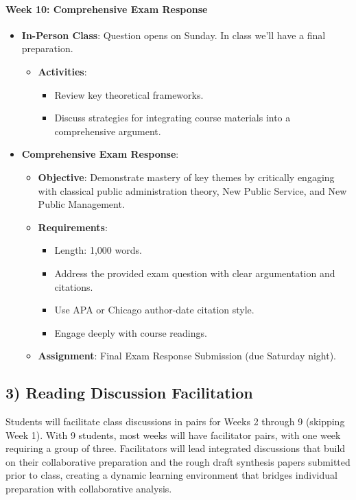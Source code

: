 \documentclass[12pt]{article}     %
\begin{document}
\paragraph{Week 10: Comprehensive Exam Response}
\begin{itemize}
    \item \textbf{In-Person Class}: Question opens on Sunday. In class we'll have a final preparation.
    \begin{itemize}
        \item \textbf{Activities}:
        \begin{itemize}
            \item Review key theoretical frameworks.
            \item Discuss strategies for integrating course materials into a comprehensive argument.
        \end{itemize}
    \end{itemize}
    \item \textbf{Comprehensive Exam Response}:
    \begin{itemize}
        \item \textbf{Objective}: Demonstrate mastery of key themes by critically engaging with classical public administration theory, New Public Service, and New Public Management.
        \item \textbf{Requirements}:
        \begin{itemize}
            \item Length: 1,000 words.
            \item Address the provided exam question with clear argumentation and citations.
            \item Use APA or Chicago author-date citation style.
            \item Engage deeply with course readings.
        \end{itemize}
        \item \textbf{Assignment}: Final Exam Response Submission (due Saturday night).
    \end{itemize}
\end{itemize}

\subsection*{3) Reading Discussion Facilitation}

Students will facilitate class discussions in pairs for Weeks 2 through 9 (skipping Week 1). With 9 students, most weeks will have facilitator pairs, with one week requiring a group of three. Facilitators will lead integrated discussions that build on their collaborative preparation and the rough draft synthesis papers submitted prior to class, creating a dynamic learning environment that bridges individual preparation with collaborative analysis.
\end{document}
